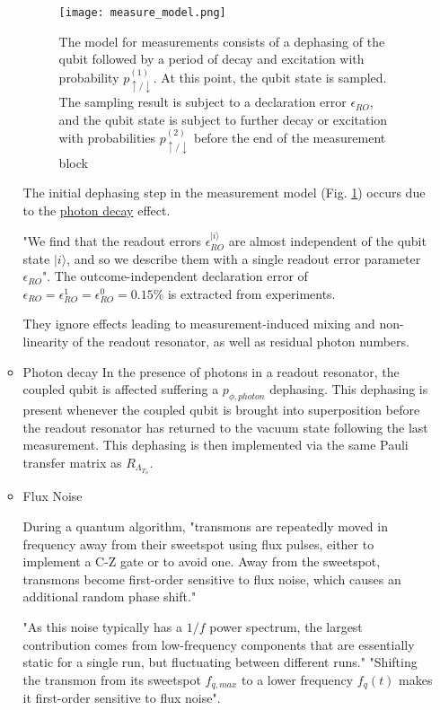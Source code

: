 \begin{itemize}
\begin{itemize}
\begin{figure}[htbp]
\centering
\texttt{[image: measure\_model.png]}
\caption{\label{fig:org04892b7}
The model for measurements consists of a dephasing of the qubit followed by a period of decay and excitation with probability \(p_{\uparrow / \downarrow}^{(1)}\). At this point, the qubit state is sampled. The sampling result is subject to a declaration error \(\epsilon_{RO}\), and the qubit state is subject to further decay or excitation with probabilities \(p_{\uparrow / \downarrow}^{(2)}\) before the end of the measurement block}
\end{figure}

The initial dephasing step in the measurement model (Fig. \ref{fig:org04892b7}) occurs due to the \hyperref[sec:org5031d82]{photon decay} effect.

"We find that the readout errors \(\epsilon_{RO}^{|i\rangle}\) are almost independent of the qubit state \(|i\rangle\), and so we describe them with a single readout error parameter \(\epsilon_{RO}\)".
The outcome-independent declaration error of \(\epsilon_{RO} = \epsilon_{RO}^{1} = \epsilon_{RO}^{0} = 0.15 \%\) is extracted from experiments. 

They ignore effects leading to measurement-induced mixing and non-linearity of the readout resonator, as well as residual photon numbers.

\item Photon decay
\label{sec:org5031d82}
In the presence of photons in a readout resonator, the coupled qubit is affected suffering a \(p_{\phi, photon}\) dephasing.
This dephasing is present whenever the coupled qubit is brought into superposition before the readout resonator has returned to the vacuum state following the last measurement.
This dephasing is then implemented via the same Pauli transfer matrix as \(R_{\Lambda_{T_{\phi}}}\).

\item Flux Noise
\label{sec:org70649cb}

During a quantum algorithm, "transmons are repeatedly moved in frequency away from their sweetspot using flux pulses, either to implement a C-Z gate or to avoid one. Away from the sweetspot, transmons become first-order sensitive to flux noise, which causes an additional random phase shift."

"As this noise typically has a \(1/f\) power spectrum, the largest contribution comes from low-frequency components that are essentially static for a single run, but fluctuating between different runs."
"Shifting the transmon from its sweetspot \(f_{q,max}\) to a lower frequency \(f_q (t)\) makes it first-order sensitive to flux noise".


\end{itemize}
\end{itemize}
